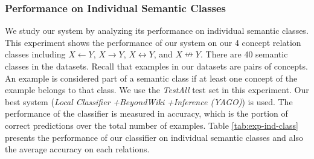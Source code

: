 \subsubsection{Performance on Individual Semantic Classes}

We study our system by analyzing its performance on individual
semantic classes. This experiment shows the performance of our system
on our 4 concept relation classes including $X \leftarrow Y$, $X
\rightarrow Y$, $X \leftrightarrow Y$, and $X \nleftrightarrow
Y$. There are 40 semantic classes in the datasets. Recall that
examples in our datasets are pairs of concepts. An example is
considered part of a semantic class if at least one concept of the
example belongs to that class. We use the {\em TestAll} test set in
this experiment. Our best system ({\em Local Classifier} {\em
  +BeyondWiki} {\em +Inference (YAGO)}) is used. The performance of
the classifier is measured in accuracy, which is the portion of
correct predictions over the total number of examples. Table
\ref{tab:exp-ind-class} presents the performance of our classifier on
individual semantic classes and also the average accuracy on each
relations.

